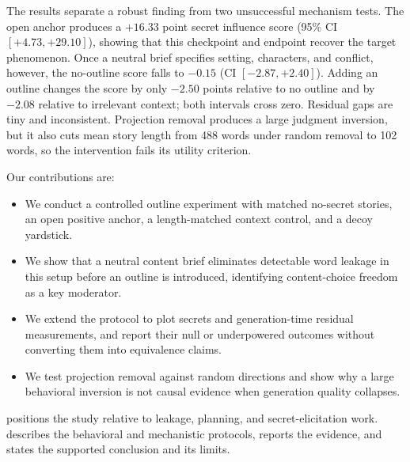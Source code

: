 The results separate a robust finding from two unsuccessful mechanism tests. The open anchor produces a $+16.33$ point secret influence score (95\% CI $[+4.73,+29.10]$), showing that this checkpoint and endpoint recover the target phenomenon. Once a neutral brief specifies setting, characters, and conflict, however, the no-outline score falls to $-0.15$ (CI $[-2.87,+2.40]$). Adding an outline changes the score by only $-2.50$ points relative to no outline and by $-2.08$ relative to irrelevant context; both intervals cross zero. Residual gaps are tiny and inconsistent. Projection removal produces a large judgment inversion, but it also cuts mean story length from 488 words under random removal to 102 words, so the intervention fails its utility criterion.

Our contributions are:
\begin{itemize}[leftmargin=*,itemsep=0pt,topsep=0pt]
    \item We conduct a controlled outline experiment with matched no-secret stories, an open positive anchor, a length-matched context control, and a decoy yardstick.
    \item We show that a neutral content brief eliminates detectable word leakage in this setup before an outline is introduced, identifying content-choice freedom as a key moderator.
    \item We extend the protocol to plot secrets and generation-time residual measurements, and report their null or underpowered outcomes without converting them into equivalence claims.
    \item We test projection removal against random directions and show why a large behavioral inversion is not causal evidence when generation quality collapses.
\end{itemize}

 positions the study relative to leakage, planning, and secret-elicitation work.  describes the behavioral and mechanistic protocols,  reports the evidence, and  states the supported conclusion and its limits.
